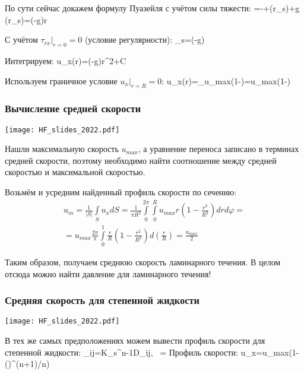 \documentclass[main.tex]{subfiles}
\begin{document}
По сути сейчас докажем формулу Пуазейля с учётом силы тяжести:
=-+\left(r\mu_s\right)+\rho g \sin{\theta}
\eeq
\beq
{}\left(r\mu_s\right)=\left(-\rho g\sin{\theta}\right)r
\eeq

С учётом $\tau_{rx}|_{r=0}=0$ (условие регулярности):
\beq
\mu_s=\left(-\rho g\sin{\theta}\right)
\eeq

Интегрируем:
\beq
u_x(r)=\left(-\rho g\sin{\theta}\right)r^2+C
\eeq

Используем граничное условие $u_x|_{r=R}=0$:
\beq
u_x(r)=_{u_{max}}\left(1-\right)=u_{max}\left(1-\right)
\eeq

\subsubsection{Вычисление средней скорости}

\texttt{[image: HF\_slides\_2022.pdf]}

Нашли максимальную скорость $u_{max}$, а уравнение переноса записано в терминах средней скорости, поэтому необходимо найти соотношение между средней скоростью и максимальной скоростью.

Возьмём и усредним найденный профиль скорости по сечению:
\begin{multline}
u_m=\frac{1}{|S|}\int\limits_S{u_xdS}=\frac{1}{\pi R^2}\int\limits_{0}^{2\pi}\int\limits_{0}^{R}u_{max}r\left(1-\frac{r^2}{R^2}\right)drd\varphi=\\=u_{max}\frac{2\pi}{\pi}\int\limits_0^1\frac{r}{R}\left(1-\frac{r^2}{R^2}\right)d\left(\frac{r}{R}\right)=\frac{u_{max}}{2}
\end{multline}

Таким образом, получаем среднюю скорость ламинарного течения.
В целом отсюда можно найти давление для ламинарного течения!

\subsubsection{Средняя скорость для степенной жидкости}

\texttt{[image: HF\_slides\_2022.pdf]}

В тех же самых предположениях можем вывести профиль скорости для степенной жидкости:
\beq
\tau_{ij}=K_s\dot{\gamma}^{n-1}D_{ij},\,\,\,\,\,\dot{\gamma}=
\eeq
Профиль скорости:
\beq
u_x=u_{max}\left(1-\left(\right)^{(n+1)/n}\right)
\eeq
\ \\
\end{document}
